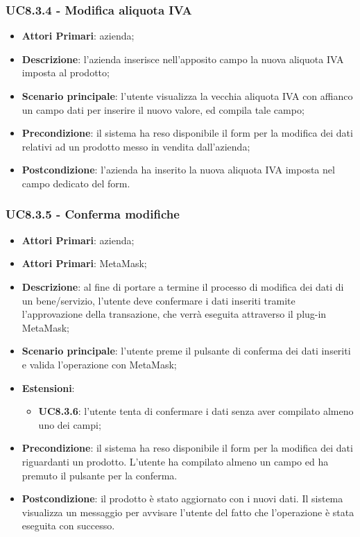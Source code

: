 \subsubsection{UC8.3.4 - Modifica aliquota IVA}
\begin{itemize}
	\item \textbf{Attori Primari}: azienda;
	\item \textbf{Descrizione}: l'azienda inserisce nell'apposito campo la 
	nuova aliquota IVA imposta al prodotto;
	\item \textbf{Scenario principale}: l'utente visualizza la vecchia aliquota IVA con affianco un campo dati per inserire il nuovo valore, ed compila 
	tale campo;
	\item \textbf{Precondizione}: il sistema ha reso disponibile il form per la modifica dei dati relativi ad un prodotto messo in vendita dall'azienda;
	\item \textbf{Postcondizione}: l'azienda ha inserito la nuova aliquota IVA imposta nel campo dedicato del form.
\end{itemize}

\subsubsection{UC8.3.5 - Conferma modifiche}
\begin{itemize}
	\item \textbf{Attori Primari}: azienda;
	\item \textbf{Attori Primari}: MetaMask\glo;
	\item \textbf{Descrizione}: al fine di portare a termine il processo di modifica dei dati di un bene/servizio, l'utente deve confermare i dati inseriti tramite l'approvazione della transazione, che verrà eseguita attraverso il plug-in MetaMask\glo;
	\item \textbf{Scenario principale}: l'utente preme il pulsante di conferma dei dati inseriti e valida l'operazione con MetaMask\glo;
	\item \textbf{Estensioni}:
	\begin{itemize}
		\item \textbf{UC8.3.6}: l'utente tenta di confermare i dati senza aver compilato almeno uno dei campi;
	\end{itemize}
	\item \textbf{Precondizione}: il sistema ha reso disponibile il form per la modifica dei dati riguardanti un prodotto. L'utente ha compilato almeno un campo ed ha premuto il pulsante per la conferma.
	\item \textbf{Postcondizione}: il prodotto è stato aggiornato con i nuovi dati. Il sistema visualizza un messaggio per avvisare l'utente del fatto che l'operazione è stata eseguita con successo.
\end{itemize}


